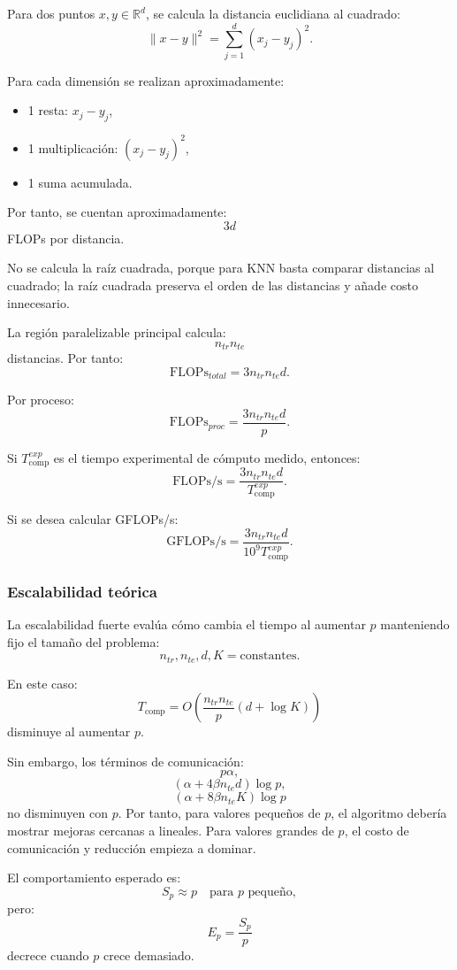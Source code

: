\documentclass[11pt,a4paper]{article}
\begin{document}
Para dos puntos $x,y \in \mathbb{R}^d$, se calcula la distancia euclidiana al cuadrado:
\[
\|x-y\|^2 = \sum_{j=1}^{d}(x_j-y_j)^2.
\]

Para cada dimensión se realizan aproximadamente:
\begin{itemize}
    \item 1 resta: $x_j-y_j$,
    \item 1 multiplicación: $(x_j-y_j)^2$,
    \item 1 suma acumulada.
\end{itemize}

Por tanto, se cuentan aproximadamente:
\[
3d
\]
FLOPs por distancia.

No se calcula la raíz cuadrada, porque para KNN basta comparar distancias al cuadrado; la raíz
cuadrada preserva el orden de las distancias y añade costo innecesario.

La región paralelizable principal calcula:
\[
n_{tr}n_{te}
\]
distancias. Por tanto:
\[
\boxed{
\mathrm{FLOPs}_{total}
=
3n_{tr}n_{te}d
}.
\]

Por proceso:
\[
\boxed{
\mathrm{FLOPs}_{proc}
=
\frac{3n_{tr}n_{te}d}{p}
}.
\]

Si $T_{\text{comp}}^{exp}$ es el tiempo experimental de cómputo medido, entonces:
\[
\boxed{
\mathrm{FLOPs/s}
=
\frac{3n_{tr}n_{te}d}{T_{\text{comp}}^{exp}}
}.
\]

Si se desea calcular GFLOPs/s:
\[
\boxed{
\mathrm{GFLOPs/s}
=
\frac{3n_{tr}n_{te}d}{10^9T_{\text{comp}}^{exp}}
}.
\]

\subsubsection{Escalabilidad teórica}

La escalabilidad fuerte evalúa cómo cambia el tiempo al aumentar $p$ manteniendo fijo el tamaño
del problema:
\[
n_{tr}, n_{te}, d, K = \text{constantes}.
\]

En este caso:
\[
T_{\text{comp}} =
O\left(
\frac{n_{tr}n_{te}}{p}(d+\log K)
\right)
\]
disminuye al aumentar $p$.

Sin embargo, los términos de comunicación:
\[
p\alpha,
\]
\[
(\alpha + 4\beta n_{te}d)\log p,
\]
\[
(\alpha + 8\beta n_{te}K)\log p
\]
no disminuyen con $p$. Por tanto, para valores pequeños de $p$, el algoritmo debería mostrar
mejoras cercanas a lineales. Para valores grandes de $p$, el costo de comunicación y reducción
empieza a dominar.

El comportamiento esperado es:
\[
S_p \approx p
\quad \text{para } p \text{ pequeño},
\]
pero:
\[
E_p = \frac{S_p}{p}
\]
decrece cuando $p$ crece demasiado.
\end{document}
